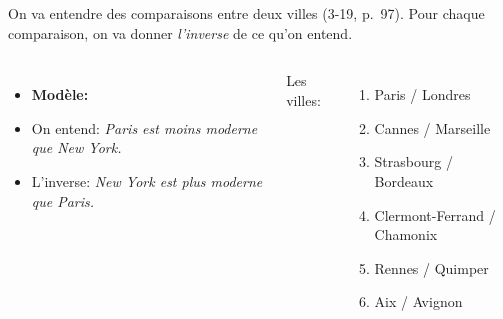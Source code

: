 \begin{frame}{}
  On va entendre des comparaisons entre deux villes (3-19, p.~97).
  Pour chaque comparaison, on va donner \emph{l'inverse} de ce qu'on entend.
  \vspace{0.5cm}
  \begin{columns}[t]
      \begin{itemize}
        \item[] \textbf{Modèle:}
        \item[] On entend: \emph{Paris est moins moderne que New York.}
        \item[] L'inverse: \emph{New York est plus moderne que Paris.}
      \end{itemize}
      Les villes:
      \begin{enumerate}
        \item Paris / Londres
        \item Cannes / Marseille
        \item Strasbourg / Bordeaux
        \item Clermont-Ferrand / Chamonix
        \item Rennes / Quimper
        \item Aix / Avignon
      \end{enumerate}
  \end{columns}
\end{frame}